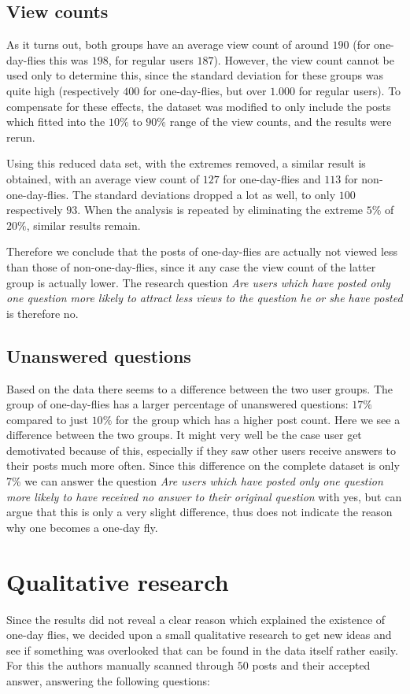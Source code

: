 \documentclass[conference]{IEEEtran}
\begin{document}
\subsection{View counts}
As it turns out, both groups have an average view count of around $190$ (for
one-day-flies this was $198$, for regular users $187$). However, the view count
cannot be used only to determine this, since the standard deviation for these
groups was quite high (respectively $400$ for one-day-flies, but over $1.000$
for regular users). To compensate for these effects, the dataset was modified
to only include the posts which fitted into the $10\%$ to $90\%$ range of the
view counts, and the results were rerun.

Using this reduced data set, with the extremes removed, a similar result is
obtained, with an average view count of $127$ for one-day-flies and $113$ for
non-one-day-flies. The standard deviations dropped a lot as well, to only $100$
respectively $93$. When the analysis is repeated by eliminating the extreme
$5\%$ of $20\%$, similar results remain.

Therefore we conclude that the posts of one-day-flies are actually not viewed
less than those of non-one-day-flies, since it any case the view count of the
latter group is actually lower. The research question \textit{Are users which
have posted only one question more likely to attract less views to the question
he or she have posted} is therefore no.

\subsection{Unanswered questions}

Based on the data there seems to a difference between the two user groups. The
group of one-day-flies has a larger percentage of unanswered questions: $17\%$
compared to just $10\%$ for the group which has a higher post count. Here we
see a  difference between the two groups. It might very well be the case user
get demotivated because of this, especially if they saw other users receive
answers to their posts much more often. Since this difference on the complete
dataset is only 7\% we can answer the question \textit{Are users which have
posted only one question more likely to have received no answer to their
original question} with yes, but can argue that this is only a very slight
difference, thus does not indicate the reason why one becomes a one-day fly.


\section{Qualitative research}\label{QualitativeResearch}
Since the results did not reveal a clear reason which explained the existence
of one-day flies, we decided upon a small qualitative research to get new ideas
and see if something was overlooked that can be found in the data itself rather
easily.  For this the authors manually scanned through $50$ posts and their
accepted answer, answering the following questions:
\end{document}

